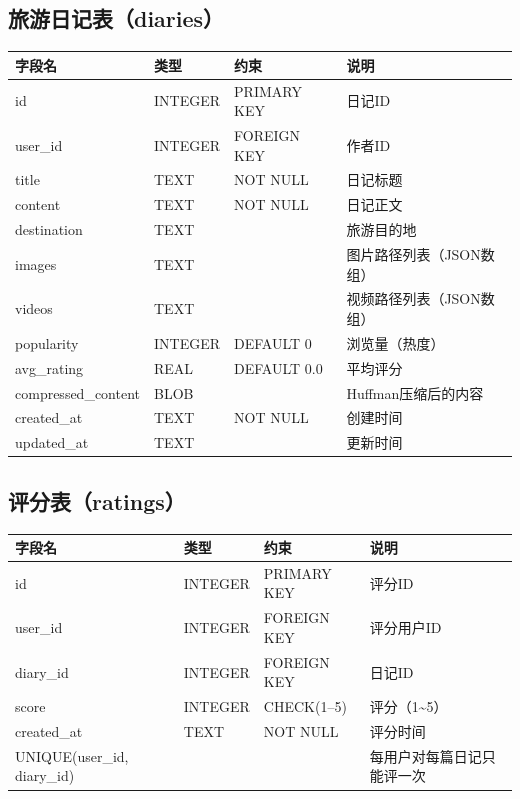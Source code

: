 \documentclass[12pt,a4paper]{report}
\begin{document}
\subsection{旅游日记表（diaries）}

\begin{table}[H]
\centering
\small
\begin{tabular}{llll}
\toprule
\textbf{字段名} & \textbf{类型} & \textbf{约束} & \textbf{说明} \\
\midrule
id & INTEGER & PRIMARY KEY & 日记ID \\
user\_id & INTEGER & FOREIGN KEY & 作者ID \\
title & TEXT & NOT NULL & 日记标题 \\
content & TEXT & NOT NULL & 日记正文 \\
destination & TEXT & & 旅游目的地 \\
images & TEXT & & 图片路径列表（JSON数组） \\
videos & TEXT & & 视频路径列表（JSON数组） \\
popularity & INTEGER & DEFAULT 0 & 浏览量（热度） \\
avg\_rating & REAL & DEFAULT 0.0 & 平均评分 \\
compressed\_content & BLOB & & Huffman压缩后的内容 \\
created\_at & TEXT & NOT NULL & 创建时间 \\
updated\_at & TEXT & & 更新时间 \\
\bottomrule
\end{tabular}
\end{table}

\subsection{评分表（ratings）}

\begin{table}[H]
\centering
\small
\begin{tabular}{llll}
\toprule
\textbf{字段名} & \textbf{类型} & \textbf{约束} & \textbf{说明} \\
\midrule
id & INTEGER & PRIMARY KEY & 评分ID \\
user\_id & INTEGER & FOREIGN KEY & 评分用户ID \\
diary\_id & INTEGER & FOREIGN KEY & 日记ID \\
score & INTEGER & CHECK(1--5) & 评分（1\textasciitilde5） \\
created\_at & TEXT & NOT NULL & 评分时间 \\
UNIQUE(user\_id, diary\_id) & & & 每用户对每篇日记只能评一次 \\
\bottomrule
\end{tabular}
\end{table}
\end{document}
